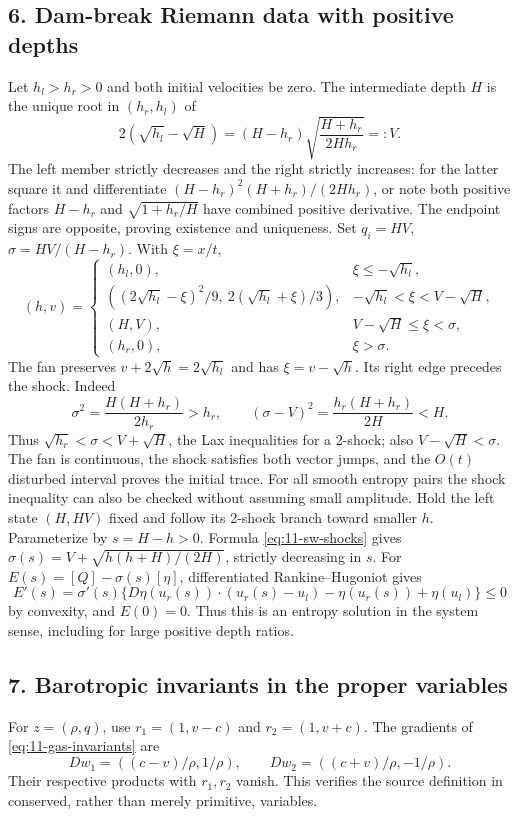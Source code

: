 \subsection*{6. Dam-break Riemann data with positive depths}
Let $h_l>h_r>0$ and both initial velocities be zero. The intermediate
depth $H$ is the unique root in $(h_r,h_l)$ of
\begin{equation}\label{eq:11-dambreak-root}
 2(\sqrt{h_l}-\sqrt H)
 =(H-h_r)\sqrt{\frac{H+h_r}{2Hh_r}}=:V.
\end{equation}
The left member strictly decreases and the right strictly increases:
for the latter square it and differentiate
$(H-h_r)^2(H+h_r)/(2Hh_r)$, or note both positive factors
$H-h_r$ and $\sqrt{1+h_r/H}$ have combined positive derivative.
The endpoint signs are opposite, proving existence and uniqueness.
Set $q_i=HV$, $\sigma=HV/(H-h_r)$. With $\xi=x/t$,
\[
 (h,v)=\begin{cases}
 (h_l,0),&\xi\le-\sqrt{h_l},\\
 ((2\sqrt{h_l}-\xi)^2/9,\ 2(\sqrt{h_l}+\xi)/3),
       &-\sqrt{h_l}<\xi<V-\sqrt H,\\
 (H,V),&V-\sqrt H\le\xi<\sigma,\\
 (h_r,0),&\xi>\sigma.
 \end{cases}
\]
The fan preserves $v+2\sqrt h=2\sqrt{h_l}$ and has
$\xi=v-\sqrt h$. Its right edge precedes the shock. Indeed
\[
 \sigma^2=\frac{H(H+h_r)}{2h_r}>h_r,\qquad
 (\sigma-V)^2=\frac{h_r(H+h_r)}{2H}<H.
\]
Thus $\sqrt{h_r}<\sigma<V+\sqrt H$, the Lax inequalities for a
2-shock; also $V-\sqrt H<\sigma$. The fan is continuous, the shock
satisfies both vector jumps, and the $O(t)$ disturbed interval proves
the initial trace. For all smooth entropy pairs the shock inequality
can also be checked without assuming small amplitude. Hold the left
state $(H,HV)$ fixed and follow its 2-shock branch toward smaller
$h$. Parameterize by $s=H-h>0$. Formula \eqref{eq:11-sw-shocks}
gives $\sigma(s)=V+\sqrt{h(h+H)/(2H)}$, strictly decreasing in $s$.
For $E(s)=[Q]-\sigma(s)[\eta]$, differentiated Rankine--Hugoniot gives
\[
 E'(s)=\sigma'(s)\{D\eta(u_r(s))\cdot(u_r(s)-u_l)
                      -\eta(u_r(s))+\eta(u_l)\}\le0
\]
by convexity, and $E(0)=0$. Thus this is an entropy solution in the
system sense, including for large positive depth ratios.

\subsection*{7. Barotropic invariants in the proper variables}
For $z=(\rho,q)$, use $r_1=(1,v-c)$ and $r_2=(1,v+c)$.
The gradients of \eqref{eq:11-gas-invariants} are
\[
 Dw_1=((c-v)/\rho,1/\rho),\qquad
 Dw_2=((c+v)/\rho,-1/\rho).
\]
Their respective products with $r_1,r_2$ vanish. This verifies the
source definition in conserved, rather than merely primitive, variables.


